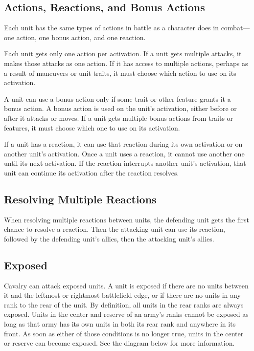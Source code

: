 \documentclass[10pt,a4paper,twoside,bg=print,twocolumn,openany,nodeprecatedcode]{dndbook}
\begin{document}
\subsection{Actions, Reactions, and Bonus Actions}
Each unit has the same types of actions in battle as a character does in combat—one action, one bonus action, and one reaction.

Each unit gets only one action per activation. If a unit gets multiple attacks, it makes those attacks as one action. If it has access to multiple actions, perhaps as a result of maneuvers or unit traits, it must choose which action to use on its activation.

A unit can use a bonus action only if some trait or other feature grants it a bonus action. A bonus action is used on the unit's activation, either before or after it attacks or moves. If a unit gets multiple bonus actions from traits or features, it must choose which one to use on its activation.

If a unit has a reaction, it can use that reaction during its own activation or on another unit's activation. Once a unit uses a reaction, it cannot use another one until its next activation. If the reaction interrupts another unit's activation, that unit can continue its activation after the reaction resolves.

\subsection{Resolving Multiple Reactions}
When resolving multiple reactions between units, the defending unit gets the first chance to resolve a reaction. Then the attacking unit can use its reaction, followed by the defending unit's allies, then the attacking unit's allies.

\subsection{Exposed}
Cavalry can attack exposed units. A unit is exposed if there are no units between it and the leftmost or rightmost battlefield edge, or if there are no units in any rank to the rear of the unit. By definition, all units in the rear ranks are always exposed. Units in the center and reserve of an army's ranks cannot be exposed as long as that army has its own units in both its rear rank and anywhere in its front. As soon as either of those conditions is no longer true, units in the center or reserve can become exposed. See the diagram below for more information.
\end{document}
